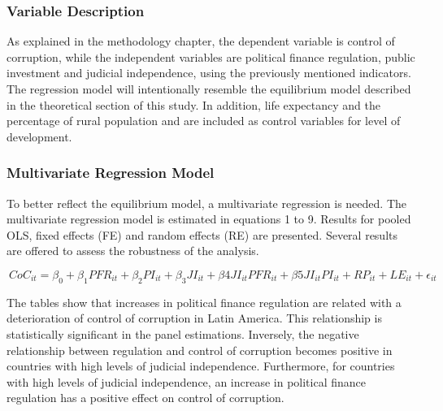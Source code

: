 \documentclass[12,twoside]{article}
\begin{document}
\subsubsection{Variable Description}\label{variable-description}

As explained in the methodology chapter, the dependent variable is
control of corruption, while the independent variables are political
finance regulation, public investment and judicial independence, using
the previously mentioned indicators. The regression model will
intentionally resemble the equilibrium model described in the
theoretical section of this study. In addition, life expectancy and the
percentage of rural population and are included as control variables for
level of development.

\subsubsection{Multivariate Regression
Model}\label{multivariate-regression-model}

To better reflect the equilibrium model, a multivariate regression is
needed. The multivariate regression model is estimated in equations 1 to
9. Results for pooled OLS, fixed effects (FE) and random effects (RE)
are presented. Several results are offered to assess the robustness of
the analysis.

\begin{equation}
\ CoC_{it} = \beta_{0} +  \beta_{1} PFR_{it} + \beta_{2} PI_{it} + \beta_{3} JI_{it} + \beta{4} JI_{it} PFR_{it} + \beta{5} JI_{it} PI_{it} + RP_{it} + LE_{it} +\epsilon_{it}
\end{equation}

The tables show that increases in political finance regulation are
related with a deterioration of control of corruption in Latin America.
This relationship is statistically significant in the panel estimations.
Inversely, the negative relationship between regulation and control of
corruption becomes positive in countries with high levels of judicial
independence. Furthermore, for countries with high levels of judicial
independence, an increase in political finance regulation has a positive
effect on control of corruption.

\pagebreak
\end{document}
